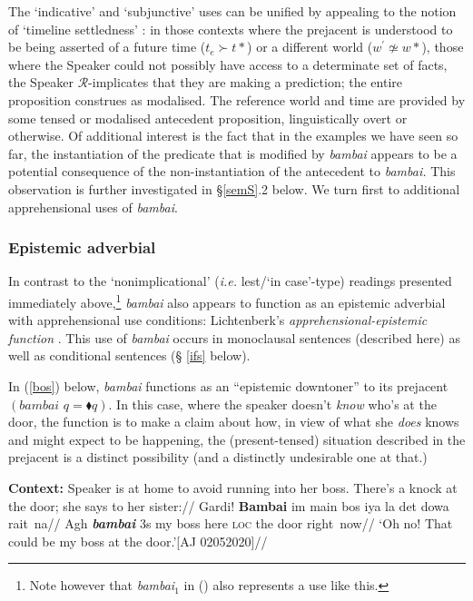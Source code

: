 \documentclass[11pt]{article}
\begin{document}
The `indicative' and `subjunctive' uses can be unified by appealing to the notion of `timeline settledness' \citep[e.g][]{Condoravdi2002}: in those contexts where the prejacent is understood to be being asserted of a future time ($t_e\succ t*$) or a different world ($w^\prime\not\simeq w*$), those where the Speaker could not possibly have access to a determinate set of facts, the Speaker $ \mathcal R $-implicates \citep[see][]{Horn1984} that they are making a prediction; the entire proposition construes as modalised. The reference world and time are provided by some tensed or modalised antecedent proposition, linguistically overt or otherwise. Of additional interest is the fact that in the examples we have seen so far, the instantiation of the predicate that is modified by \textit{bambai} appears to be a potential consequence of the non-instantiation of the antecedent to \textit{bambai.} This observation is further investigated in §\ref{semS}.2 below. We turn first to additional apprehensional uses of \textit{bambai}.

\subsubsection{Epistemic adverbial}\label{ep.adv}

In contrast to the `nonimplicational' (\textit{i.e. }{\sc lest}/`in case'-type) readings presented immediately above,\footnote{Note however that  \textit{bambai}$_1$ in () also represents a use like this.} \textit{bambai} also appears to function as an epistemic adverbial with apprehensional use conditions: Lichtenberk's \textit{apprehensional-epistemic function} \citeyearpar{Lichtenberk1995}. This use of \textit{bambai} occurs in monoclausal sentences (described here) as well as conditional sentences (§ \ref{ifs} below).

In (\ref{bos}) below, \textit{bambai} functions as an ``epistemic downtoner'' \citep[cf.][]{Lichtenberk1995} to its prejacent $ (\textit{bambai }q=\blacklozenge q) $. In this case, where the speaker doesn't \textit{know} who's at the door, the function is to make a claim about how, in view of what she \textit{does} knows and might expect to be happening, the (present-tensed) situation described in the prejacent is a distinct possibility (and a distinctly undesirable one at that.)



	\ex\label{bos}\begingl\glpreamble\textup{\textbf{Context:} Speaker is at home to avoid running into her boss. There's a knock at the door; she says to her sister:}//
	\gla Gardi! \textbf{Bambai} im main bos iya la det dowa rait~na//
	\glb Agh \textit{\textbf{bambai}} 3s my boss here \textsc{loc} the door right~now//
	\glft`Oh no! That could be my boss at the door.'\hfill[AJ 02052020]//\endgl
\xe
\end{document}
